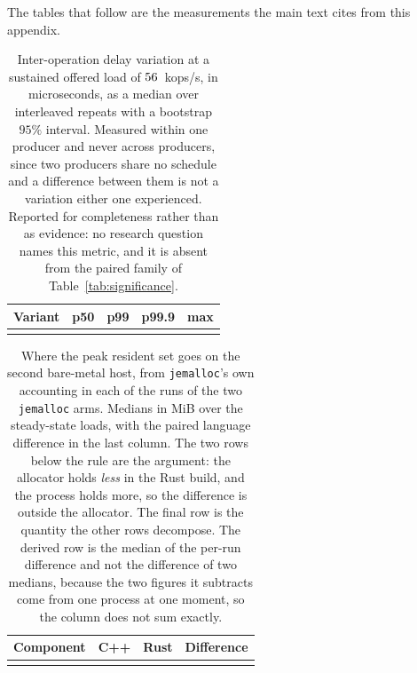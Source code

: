 \documentclass[english,oneside,a4paper,censored,csm,software-track-2020]{HYthesisML}
\begin{document}
\begin{appendices}
The tables that follow are the measurements the main text cites from this appendix.

\begin{table}[ht]
\centering
\small
\caption[Inter-operation jitter at the representative load]{Inter-operation delay variation at a
sustained offered load of $56$~kops/s, in microseconds, as a median over \NRepeats{}
interleaved repeats with a bootstrap $95\%$ interval. Measured within one producer and never across
producers, since two producers share no schedule and a difference between them is not a variation
either one experienced. Reported for completeness rather than as evidence: no research question
names this metric, and it is absent from the paired family of
Table~\ref{tab:significance}.\label{tab:jitter}}
\begin{tabular}{@{}l r r r r@{}}
\hline\hline
Variant & p50 & p99 & p99.9 & max \\
\hline
\\
\hline
\end{tabular}
\end{table}

\begin{table}[ht]
\centering
\small
\caption[The resident set decomposed by the allocator]{Where the peak resident set goes on the
second bare-metal host, from \texttt{jemalloc}'s own accounting in each of the \BmJeRuns{} runs of
the two \texttt{jemalloc} arms. Medians in MiB over the steady-state loads, with the paired language
difference in the last column. The two rows below the rule are the argument: the allocator holds
\emph{less} in the Rust build, and the process holds more, so the difference is outside the
allocator. The final row is the quantity the other rows decompose. The derived row is the median of
the per-run difference and not the difference of two medians, because the two figures it subtracts
come from one process at one moment, so the column does not sum
exactly.\label{tab:resident}}
\begin{tabular}{@{}l r r r@{}}
\hline\hline
Component & C++ & Rust & Difference \\
\hline
\\
\hline
\end{tabular}
\end{table}


\end{appendices}
\end{document}
